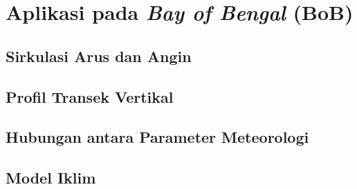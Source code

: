 \vspace{1.5pc}
\section[Aplikasi pada \textit{Bay of Bengal}(BoB)]{Aplikasi pada \textit{Bay of Bengal} (BoB)}
\begin{spacing}{1.5}
\vspace{-1pc}
\subsection[Sirkulasi Arus dan Angin]{Sirkulasi Arus dan Angin}
	
	\lipsum[1]

\subsection[Profil Transek Vertikal]{Profil Transek Vertikal}
	
	\lipsum[1]
	
\subsection[Hubungan antara Parameter Meteorologi]{Hubungan antara Parameter Meteorologi}
	
	\lipsum[1]
	

\subsection[Model Iklim]{Model Iklim}
	
	\lipsum[1]
	
\end{spacing}

